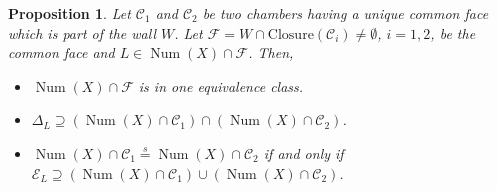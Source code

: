 \documentclass[11pt,twoside]{amsart}
\newtheorem{proposition}[theorem]{Proposition}
\theoremstyle{definition}
\newcommand {\Closure}{\mathrm{Closure}}
\newcommand{\Num}{\operatorname{Num}}
\begin{document}
\begin{proposition}
    Let $\mathcal{C}_1$ and $\mathcal{C}_2$ be two chambers having a unique common face which is part of the wall $W$. Let $\mathcal{F}=W\cap \Closure(\mathcal{C}_i)\neq\emptyset$, $i=1,2$, be the common face and $L\in\Num(X)\cap\mathcal{F}$. Then,
    \begin{itemize}
        \item[i)] $\Num(X)\cap\mathcal{F}$ is in one equivalence class. 
        \item[ii)] $\Delta_{L}\supseteq (\Num(X)\cap\mathcal{C}_1)\cap(\Num(X)\cap\mathcal{C}_2)$.
        \item[iii)]$\Num(X)\cap\mathcal{C}_1\overset{s}{=}\Num(X)\cap\mathcal{C}_2$ if and only if $ \mathcal{E}_L\supseteq (\Num(X)\cap\mathcal{C}_1)\cup (\Num(X)\cap\mathcal{C}_2)$. 
    \end{itemize}
\end{proposition}
\end{document}
